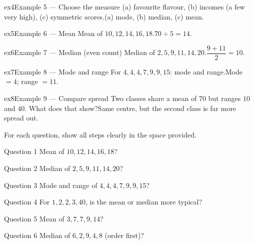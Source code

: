 \documentclass[11pt]{article}
\begin{document}
\begin{example}{ex4}{Example 5 --- Choose the measure}
(a) favourite flavour, (b) incomes (a few very high), (c) symmetric scores.\soln (a) mode, (b) median, (c) mean.
\end{example}

\begin{example}{ex5}{Example 6 --- Mean}
Mean of $10,12,14,16,18$.\soln $70\div5=14$.
\end{example}

\begin{example}{ex6}{Example 7 --- Median (even count)}
Median of $2,5,9,11,14,20$.\soln $\dfrac{9+11}{2}=10$.
\end{example}

\begin{example}{ex7}{Example 8 --- Mode and range}
For $4,4,4,7,9,9,15$: mode and range.\soln Mode $=4$; range $=11$.
\end{example}

\begin{example}{ex8}{Example 9 --- Compare spread}
Two classes share a mean of $70$ but ranges $10$ and $40$. What does that show?\soln Same centre, but the second class is far more spread out.
\end{example}

\clearpage
{}
For each question, show all steps clearly in the space provided.

\begin{qbox}{Question 1}
Mean of $10,12,14,16,18$?\workspace{2.4cm}
\end{qbox}

\begin{qbox}{Question 2}
Median of $2,5,9,11,14,20$?\workspace{2.4cm}
\end{qbox}

\begin{qbox}{Question 3}
Mode and range of $4,4,4,7,9,9,15$?\workspace{2.4cm}
\end{qbox}

\begin{qbox}{Question 4}
For $1,2,2,3,40$, is the mean or median more typical?\workspace{2.4cm}
\end{qbox}

\begin{qbox}{Question 5}
Mean of $3,7,7,9,14$?\workspace{2.4cm}
\end{qbox}

\begin{qbox}{Question 6}
Median of $6,2,9,4,8$ (order first)?\workspace{2.4cm}
\end{qbox}
\end{document}
